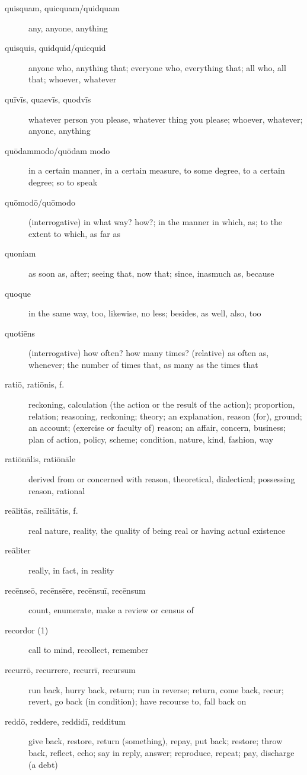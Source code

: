 \begin{description}
    \item[quisquam, quicquam/quidquam] \marginnote{*}any, anyone, anything
    \item[quisquis, quidquid/quicquid] \marginnote{*}anyone who, anything that; everyone who, everything that; all who, all that; whoever, whatever
    \item[quīvīs, quaevīs, quodvīs] whatever person you please, whatever thing you please; whoever, whatever; anyone, anything
    \item[quōdammodo/quōdam modo] in a certain manner, in a certain measure, to some degree, to a certain degree; so to speak
    \item[quōmodō/quōmodo] (interrogative) in what way? how?; in the manner in which, as; to the extent to which, as far as
    \item[quoniam] \marginnote{*}as soon as, after; seeing that, now that; since, inasmuch as, because
    \item[quoque] \marginnote{*}in the same way, too, likewise, no less; besides, as well, also, too
    \item[quotiēns] \marginnote{*}(interrogative) how often? how many times? (relative) as often as, whenever; the number of times that, as many as the times that
    \item[ratiō, ratiōnis, f.] \marginnote{*}reckoning, calculation (the action or the result of the action); proportion, relation; reasoning, reckoning; theory; an explanation, reason (for), ground; an account; (exercise or faculty of) reason; an affair, concern, business; plan of action, policy, scheme; condition, nature, kind, fashion, way
    \item[ratiōnālis, ratiōnāle] derived from or concerned with reason, theoretical, dialectical; possessing reason, rational
    \item[reālitās, reālitātis, f.] real nature, reality, the quality of being real or having actual existence
    \item[reāliter] really, in fact, in reality
    \item[recēnseō, recēnsēre, recēnsuī, recēnsum] count, enumerate, make a review or census of
    \item[recordor (1)] call to mind, recollect, remember
    \item[recurrō, recurrere, recurrī, recursum] run back, hurry back, return; run in reverse; return, come back, recur; revert, go back (in condition); have recourse to, fall back on
    \item[reddō, reddere, reddidī, redditum] \marginnote{*}give back, restore, return (something), repay, put back; restore; throw back, reflect, echo; say in reply, answer; reproduce, repeat; pay, discharge (a debt)

\end{description}
